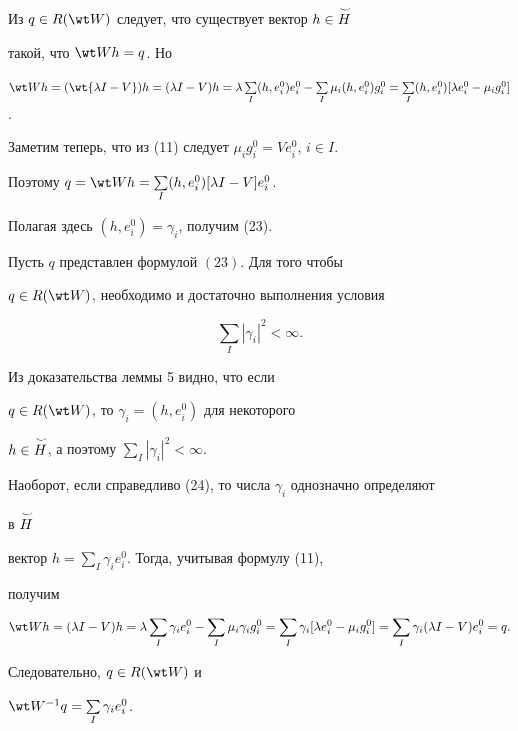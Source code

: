  


\begin{pf} 


Из $q\in R(\wt W)$ следует, что существует вектор $h\in\overset{\,\smile}{H}{}$ 


такой, что $\wt Wh=q$. Но 


$\wt Wh=(\wt{\lambda I-V})h=(\lambda I-V)h= 


\lambda\sum\limits_I(h,e^0_i)e^0_i-\sum\limits_I \mu_i 


(h,e^0_i)g^0_i=\sum\limits_I(h,e^0_i)[\lambda e^0_i- 


\mu_i g^0_i]$. 


Заметим теперь, что из (11) следует $\mu_i g^0_i=V e^0_i$, $i\in I$. 


Поэтому $q=\wt Wh=\sum\limits_I(h,e^0_i)[\lambda I-V]e^0_i$. 


Полагая здесь $(h,e^0_i)=\gamma_i$, получим (23). 


\end{pf} 


 


\begin{lem} 


Пусть $q$ представлен формулой $(23)$. Для того чтобы 


$q\in R(\wt W)$, необходимо и достаточно выполнения условия 


\begin{equation} 


\sum_I|\gamma_i|^2<\infty .


\end{equation} 


\end{lem} 


 


\begin{pf} 


Из доказательства леммы 5 видно, что если 


$q\in R(\wt W)$, то $\gamma_i=(h,e^0_i)$ для некоторого 


$h\in\overset{\,\smile}{H}{}$, а поэтому $\sum\limits_I|\gamma_i|^2<\infty$. 


Наоборот, если справедливо (24), то числа $\gamma_i$ однозначно определяют 


в $\overset{\,\smile}{H}{}$ 


вектор $h=\sum\limits_I\gamma_i e^0_i$. Тогда, учитывая формулу (11), 


получим 


$$ 


\wt Wh=(\lambda I-V)h=\lambda\sum_I \gamma_i e^0_i- 


\sum_I \mu_i\gamma_i g^0_i= 


\sum_I \gamma_i[\lambda e^0_i-\mu_i g^0_i]= 


\sum_I \gamma_i(\lambda I-V)e^0_i=q. 


$$ 


Следовательно, $q\in R(\wt W)$ и 


$\wt W^{-1}q=\sum\limits_I\gamma_i e^0_i$. 


\end{pf} 


